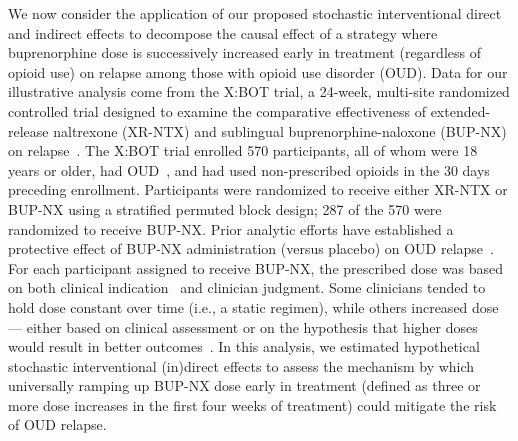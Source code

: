 We now consider the application of our proposed stochastic interventional direct
and indirect effects to decompose the causal effect of a strategy where
buprenorphine dose is successively increased early in treatment (regardless of
opioid use) on relapse among those with opioid use disorder (OUD). Data for our
illustrative analysis come from the X:BOT trial, a 24-week, multi-site
randomized controlled trial designed to examine the comparative effectiveness of
extended-release naltrexone (XR-NTX) and sublingual buprenorphine-naloxone
(BUP-NX) on relapse~\citep{lee2018comparative, lee2016nida, nunes2016ethical}.
The X:BOT trial enrolled 570 participants, all of whom were 18 years or older,
had OUD~\citep[as per the Diagnostic and Statistical Manual of Mental
Disorders-5;][]{apa2013dsm5}, and had used non-prescribed opioids in the 30 days
preceding enrollment. Participants were randomized to receive either XR-NTX or
BUP-NX using a stratified permuted block design; 287 of the 570 were randomized
to receive BUP-NX. Prior analytic efforts have established a protective effect
of BUP-NX administration (versus placebo) on OUD
relapse~\citep{mattick2014buprenorphine}. For each participant assigned to
receive BUP-NX, the prescribed dose was based on both clinical
indication~\citep{lee2018comparative} and clinician judgment. Some clinicians
tended to hold dose constant over time (i.e., a static regimen), while others
increased dose --- either based on clinical assessment or on the hypothesis that
higher doses would result in better outcomes~\citep{nutt2015considerations,
greenwald2003effects, comer2005buprenorphine, heikman2017polydrug}. In this
analysis, we estimated hypothetical stochastic interventional (in)direct effects
to assess the mechanism by which universally ramping up BUP-NX dose early in
treatment (defined as three or more dose increases in the first four weeks of
treatment) could mitigate the risk of OUD relapse.

